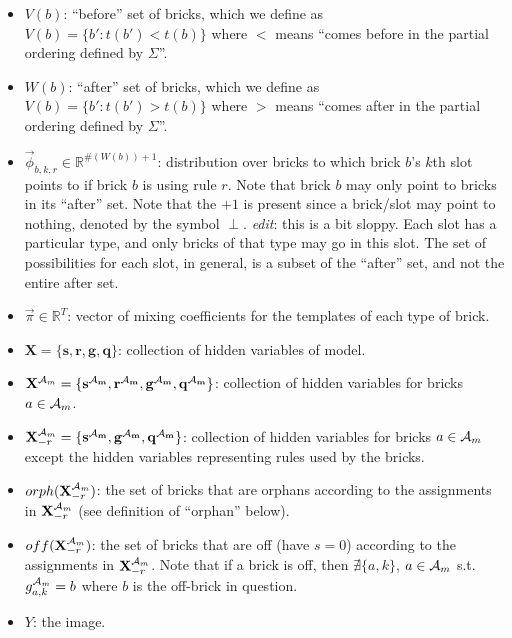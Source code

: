 \documentclass[11pt]{article}
\newcommand{\A}{{\cal A}}
\newcommand{\X}{\mathbf{X}}
\newcommand{\symb}{\Sigma}
\newcommand{\Xrm}{\X^{\Am}_{-r}}
\newcommand{\Am}{\A_{m}}
\newcommand{\Real}{\mathbb{R}}
\begin{document}
\begin{itemize}
\item $V(b)$: ``before'' set of bricks, which we define as $V(b) = \{b' : t(b') < t(b) \}$ where $<$ means ``comes before in the partial ordering defined by $\symb$''.

\item $W(b)$: ``after'' set of bricks, which we define as $V(b) = \{b' : t(b') > t(b) \}$ where $>$ means ``comes after in the partial ordering defined by $\symb$''.

\item $\vec{\phi}_{b,k,r} \in \mathbb{R}^{\#(W(b))+1}$: distribution over bricks to which brick $b$'s $k$th slot points to if brick $b$ is using rule $r$. Note that brick $b$ may only point to bricks in its ``after'' set. Note that the $+1$ is present since a brick/slot may point to nothing, denoted by the symbol $\perp$. \emph{edit}: this is a bit sloppy. Each slot has a particular type, and only bricks of that type may go in this slot. The set of possibilities for each slot, in general, is a subset of the ``after'' set, and not the entire after set.

\item $\vec{\pi} \in \Real^T$: vector of mixing coefficients for the templates of each type of brick.

\item $\X = \{ \mathbf{s}, \mathbf{r}, \mathbf{g}, \mathbf{q}\}$: collection of hidden variables of model.

\item $\X^{\Am} = \{ \mathbf{s^{\Am}}, \mathbf{r^{\Am}}, \mathbf{g^{\Am}}, \mathbf{q^{\Am}} \}$: collection of hidden variables for bricks $a \in \Am$.

\item $\Xrm = \{ \mathbf{s^{\Am}}, \mathbf{g^{\Am}}, \mathbf{q^{\Am}} \}$: collection of hidden variables for bricks $a \in \Am$ except the hidden variables representing rules used by the bricks.

\item $orph(\Xrm)$: the set of bricks that are orphans according to the assignments in $\Xrm$ (see definition of ``orphan'' below).

\item $off(\Xrm)$: the set of bricks that are off (have $s = 0$) according to the assignments in $\Xrm$. Note that if a brick is off, then $\nexists \{a,k\}$, $a \in \Am$ s.t. $g^{\Am}_{a,k} = b$ where $b$ is the off-brick in question.

\item $Y$: the image.

\end{itemize}
\end{document}
